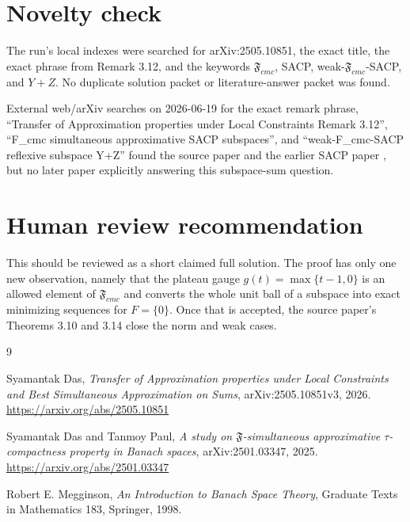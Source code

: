 \documentclass[11pt]{article}
\newcommand{\Fc}{\mathfrak F_{cmc}}
\begin{document}
\section{Novelty check}

The run's local indexes were searched for arXiv:2505.10851, the exact title,
the exact phrase from Remark 3.12, and the keywords \(\Fc\), SACP,
weak-\(\Fc\)-SACP, and \(Y+Z\).  No duplicate solution packet or
literature-answer packet was found.

External web/arXiv searches on 2026-06-19 for the exact remark phrase,
``Transfer of Approximation properties under Local Constraints Remark 3.12'',
``F\_cmc simultaneous approximative SACP subspaces'', and
``weak-F\_cmc-SACP reflexive subspace Y+Z'' found the source paper
\cite{Das2505} and the earlier SACP paper \cite{DasPaul2501}, but no later
paper explicitly answering this subspace-sum question.

\section{Human review recommendation}

This should be reviewed as a short claimed full solution.  The proof has only
one new observation, namely that the plateau gauge \(g(t)=\max\{t-1,0\}\) is
an allowed element of \(\Fc\) and converts the whole unit ball of a subspace
into exact minimizing sequences for \(F=\{0\}\).  Once that is accepted, the
source paper's Theorems 3.10 and 3.14 close the norm and weak cases.

\begin{thebibliography}{9}

Syamantak Das,
\emph{Transfer of Approximation properties under Local Constraints and Best
Simultaneous Approximation on Sums},
arXiv:2505.10851v3, 2026.
\url{https://arxiv.org/abs/2505.10851}

Syamantak Das and Tanmoy Paul,
\emph{A study on \(\mathfrak F\)-simultaneous approximative
\(\tau\)-compactness property in Banach spaces},
arXiv:2501.03347, 2025.
\url{https://arxiv.org/abs/2501.03347}

Robert E. Megginson,
\emph{An Introduction to Banach Space Theory},
Graduate Texts in Mathematics 183, Springer, 1998.

\end{thebibliography}
\end{document}
